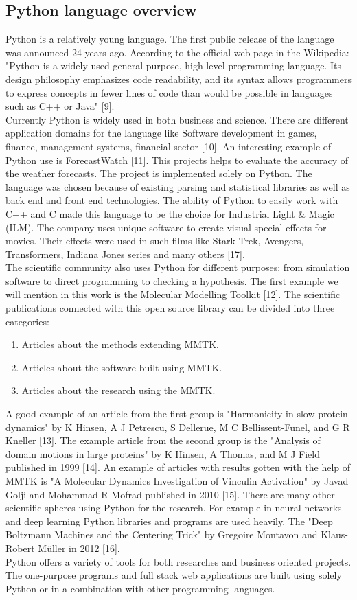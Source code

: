 \documentclass [twoside,
  11pt, a4paper,
  footinclude=true,
  headinclude=true,
  cleardoublepage=empty
]{article}
\begin{document}
\newpage
\subsection{Python language overview}
Python is a relatively young language. The first public release of the language was announced 24 years ago. According to the official web page in the Wikipedia: "Python is a widely used general-purpose, high-level programming language. Its design philosophy emphasizes code readability, and its syntax allows programmers to express concepts in fewer lines of code than would be possible in languages such as C++ or Java" [9].\\
Currently Python is widely used in both business and science. There are different application domains for the language like Software development in games, finance, management systems, financial sector [10]. An interesting example of Python use is ForecastWatch [11]. This projects helps to evaluate the accuracy of the weather forecasts. The project is implemented solely on Python. The language was chosen because of existing parsing and statistical libraries as well as back end and front end technologies. The ability of Python to easily work with C++ and C made this language to be the choice for Industrial Light \& Magic (ILM). The company uses unique software to create visual special effects for movies. Their effects were used in such films like Stark Trek, Avengers, Transformers, Indiana Jones series and many others [17].\\
The scientific community also uses Python for different purposes: from simulation software to direct programming to checking a hypothesis. The first example we will mention in this work is the Molecular Modelling Toolkit [12]. The scientific publications connected with this open source library can be divided into three categories:
\begin{enumerate}
    \item Articles about the methods extending MMTK.
    \item Articles about the software built using MMTK.
    \item Articles about the research using the MMTK.
\end{enumerate}
A good example of an article from the first group is "Harmonicity in slow protein dynamics" by K Hinsen, A J Petrescu, S Dellerue, M C Bellissent-Funel, and G R Kneller [13]. The example article from the second group is the "Analysis of domain motions in large proteins" by K Hinsen, A Thomas, and M J Field published in 1999 [14]. An example of articles with results gotten with the help of MMTK is "A Molecular Dynamics Investigation of Vinculin Activation" by Javad Golji and Mohammad R Mofrad published in 2010 [15]. There are many other scientific spheres using Python for the research. For example in neural networks and deep learning Python libraries and programs are used heavily. The "Deep Boltzmann Machines and the Centering Trick" by Gregoire Montavon and Klaus-Robert Müller in 2012 [16].\\
Python offers a variety of tools for both researches and business oriented projects. The one-purpose programs and full stack web applications are built using solely Python or in a combination with other programming languages. 
\end{document}
